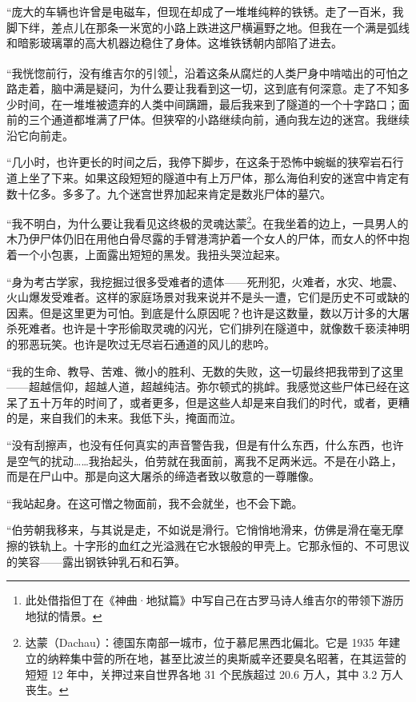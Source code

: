 \documentclass[AutoFakeBold=true]{book}
\begin{document}
``庞大的车辆也许曾是电磁车，但现在却成了一堆堆纯粹的铁锈。走了一百米，我脚下绊，差点儿在那条一米宽的小路上跌进这尸横遍野之地。但我在一个满是弧线和暗影玻璃罩的高大机器边稳住了身体。这堆铁锈朝内部陷了进去。

``我恍惚前行，没有维吉尔的引领\footnote{此处借指但丁在《神曲·地狱篇》中写自己在古罗马诗人维吉尔的带领下游历地狱的情景。}，沿着这条从腐烂的人类尸身中啃啮出的可怕之路走着，脑中满是疑问，为什么要让我看到这一切，这到底有何深意。走了不知多少时间，在一堆堆被遗弃的人类中间蹒跚，最后我来到了隧道的一个十字路口；面前的三个通道都堆满了尸体。但狭窄的小路继续向前，通向我左边的迷宫。我继续沿它向前走。

``几小时，也许更长的时间之后，我停下脚步，在这条于恐怖中蜿蜒的狭窄岩石行道上坐了下来。如果这段短短的隧道中有上万尸体，那么海伯利安的迷宫中肯定有数十亿多。多多了。九个迷宫世界加起来肯定是数兆尸体的墓穴。

``我不明白，为什么要让我看见这终极的灵魂达蒙\footnote{达蒙（Dachau）：德国东南部一城市，位于慕尼黑西北偏北。它是 1935 年建立的纳粹集中营的所在地，甚至比波兰的奥斯威辛还要臭名昭著，在其运营的短短 12 年中，关押过来自世界各地 31 个民族超过 20.6 万人，其中 3.2 万人丧生。}。在我坐着的边上，一具男人的木乃伊尸体仍旧在用他白骨尽露的手臂港湾护着一个女人的尸体，而女人的怀中抱着一个小包裹，上面露出短短的黑发。我扭头哭泣起来。

``身为考古学家，我挖掘过很多受难者的遗体——死刑犯，火难者，水灾、地震、火山爆发受难者。这样的家庭场景对我来说并不是头一遭，它们是历史不可或缺的因素。但是这里更为可怕。到底是什么原因呢？也许是这数量，数以万计多的大屠杀死难者。也许是十字形偷取灵魂的闪光，它们排列在隧道中，就像数千亵渎神明的邪恶玩笑。也许是吹过无尽岩石通道的风儿的悲吟。

``我的生命、教导、苦难、微小的胜利、无数的失败，这一切最终把我带到了这里——超越信仰，超越人道，超越纯洁。弥尔顿式的挑衅。我感觉这些尸体已经在这呆了五十万年的时间了，或者更多，但是这些人却是来自我们的时代，或者，更糟的是，来自我们的未来。我低下头，掩面而泣。

``没有刮擦声，也没有任何真实的声音警告我，但是有什么东西，什么东西，也许是空气的扰动……我抬起头，伯劳就在我面前，离我不足两米远。不是在小路上，而是在尸山中。那是向这大屠杀的缔造者致以敬意的一尊雕像。

``我站起身。在这可憎之物面前，我不会就坐，也不会下跪。

``伯劳朝我移来，与其说是走，不如说是滑行。它悄悄地滑来，仿佛是滑在毫无摩擦的铁轨上。十字形的血红之光溢溅在它水银般的甲壳上。它那永恒的、不可思议的笑容——露出钢铁钟乳石和石笋。
\end{document}
